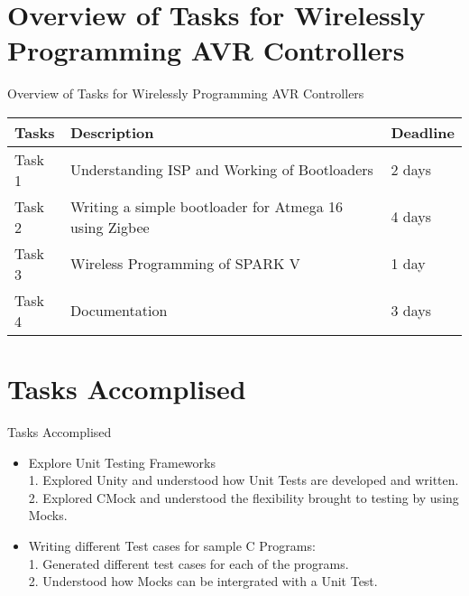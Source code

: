 \documentclass[10pt, a4paper]{beamer}
\begin{document}
\section{Overview of Tasks for Wirelessly Programming AVR Controllers}
\begin{frame}{Overview of Tasks for Wirelessly Programming AVR Controllers}
	\begin{center}
	\begin{tabular}{ |p{2cm}|p{5cm}|p{1.5cm}| }
	\hline
 	 Tasks & Description & Deadline \\
	\hline
 	 Task 1 & Understanding ISP and Working of Bootloaders & 2 days \\ 
	\hline
	 Task 2 & Writing a simple bootloader for Atmega 16 using Zigbee & 4 days \\ 
	\hline
	 Task 3 & Wireless Programming of SPARK V & 1 day \\ 
	 \hline
	 Task 4 & Documentation & 3 days \\ 
	\hline
	\end{tabular}
	\end{center}
\end{frame}


\section{Tasks Accomplised}
\begin{frame}{Tasks Accomplised}
	\begin{itemize}
	  \item Explore Unit Testing Frameworks\\
	  \hspace{.1cm} 1. Explored Unity and understood how Unit Tests are developed and written.\\
          \hspace{.1cm} 2. Explored CMock and understood the flexibility brought to testing by using Mocks.\\
	  \item Writing different Test cases for sample C Programs:\\
	  \hspace{.1cm} 1. Generated different test cases for each of the programs. \\
          \hspace{.1cm} 2. Understood how Mocks can be intergrated with a Unit Test. \\
	\end{itemize}
\end{frame}
\end{document}
